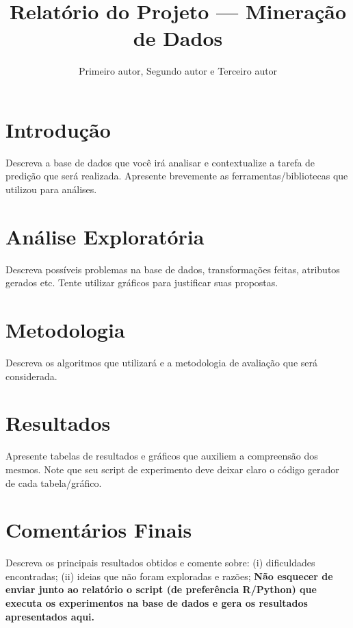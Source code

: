 \documentclass{article}
\title{Relatório do Projeto --- Mineração de Dados}
\author{Primeiro autor, Segundo autor e Terceiro autor}
\date{}
\begin{document}
\maketitle
\section{Introdução}

Descreva a base de dados que você irá analisar e contextualize a tarefa de
predição que será realizada. Apresente brevemente as ferramentas/bibliotecas que utilizou para análises.

\section{Análise Exploratória}

Descreva possíveis problemas na base de dados, transformações feitas, atributos gerados etc.
Tente utilizar gráficos para justificar suas propostas.

\section{Metodologia}

Descreva os algoritmos que utilizará e a metodologia de avaliação que será
considerada.

\section{Resultados}

Apresente tabelas de resultados e gráficos que auxiliem a compreensão dos
mesmos.
Note que seu script de experimento deve deixar claro o código gerador de cada tabela/gráfico.

\section{Comentários Finais}

Descreva os principais resultados obtidos e comente sobre:
(i) dificuldades encontradas;
(ii) ideias que não foram exploradas e razões;
\textbf{Não esquecer de enviar junto ao relatório o script (de preferência R/Python) que executa os experimentos na base de dados e gera os resultados apresentados aqui.}
\end{document}
